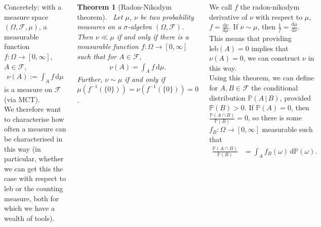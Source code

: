 \documentclass{tikzposter} %
\newtheorem{theorem}{Theorem}
\begin{document}
\begin{columns}
{{      Concretely: with a measure space $(\Omega, \mathcal{F}, \mu)$, a measurable function $f : \Omega \to [0,\infty]$, $A \in \mathcal{F}$,
      \begin{align*}
        \nu(A) := \int_{A} f \, \mathrm{d}\mu
      \end{align*}
      is a measure on $\mathcal{F}$ (via MCT). \\

      We therefore want to characterise how often a measure can be characterised in this way (in particular, whether we can get this the case with respect to $\mathrm{leb}$ or the counting measure, both for which we have a wealth of tools). \\

      \begin{theorem}[Radon-Nikodym theorem]
        \ Let $\mu$, $\nu$ be two probability measures on a $\sigma$-algebra $(\Omega, \mathcal{F})$. Then $\nu \ll \mu$ if and only if there is a measurable function $f : \Omega \to [0,\infty]$ such that for $A \in \mathcal{F}$,
        \begin{align*}
          \nu(A) = \int_{A} f\, \mathrm{d}\mu.
        \end{align*}
        Further, $\nu \sim \mu$ if and only if $\mu(f^{-1}(\{0\})) = \nu(f^{-1}(\{0\})) = 0$.
      \end{theorem}
      \hphantom{}

      We call $f$ the radon-nikodym derivative of $\nu$ with respect to $\mu$, $\displaystyle f = \frac{\mathrm{d}\nu}{\mathrm{d}\mu}$. If $\nu \sim \mu$, then $\displaystyle \frac{1}{f} = \frac{\mathrm{d}\mu}{\mathrm{d}\nu}$. \\

      This means that providing $\mathrm{leb}(A) = 0$ implies that $\nu(A) = 0$, we can construct $\nu$ in this way. \\

      Using this theorem, we can define for $A, B \in \mathcal{F}$ the conditional distribution $\mathbb{P}(A \,|\, B)$, provided $\mathbb{P}(B) > 0$. If $\mathbb{P}(A) = 0$, then $\displaystyle \frac{\mathbb{P}(A \cap B)}{\mathbb{P}(B)} = 0$, so there is some $f_{B} : \Omega \to [0,\infty]$ measurable such that
      \begin{align*}
        \frac{\mathbb{P}(A \cap B)}{\mathbb{P}(B)} &= \int_{A} f_{B}(\omega) \, \mathrm{d}\mathbb{P}(\omega).
      \end{align*}
    }
}
\end{columns}
\end{document}
